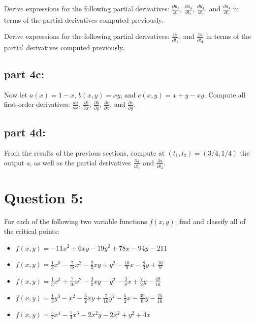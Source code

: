 \documentclass{article}
\newcommand{\partdiff}[2]{\frac{\partial #1}{\partial #2}}
\begin{document}
Derive expressions for the following partial derivatives: \(\partdiff{u_3}{t_1}\), \(\partdiff{u_3}{t_2}\), \(\partdiff{u_4}{t_1}\), and \(\partdiff{u_4}{t_2}\) in terms of the partial derivatives computed previously.

Derive expressions for the following partial derivatives: \(\partdiff{s}{t_1}\), and \(\partdiff{s}{t_2}\) in terms of the partial derivatives computed previously.

\subsection*{part 4c:}

Now let \(a(x) = 1 - x\), \(b(x,y) = xy\), and \(c(x,y) = x + y - xy\). Compute all first-order derivatives: \(\frac{da}{dx}\), \(\frac{\partial b}{\partial x}\), \(\frac{\partial b}{\partial y}\), \(\frac{\partial c}{\partial x}\), and \(\frac{\partial c}{\partial y}\).

\subsection*{part 4d:}

From the results of the previous sections, compute at \((t_1, t_2) = (3/4, 1/4)\) the output \(s\), as well as the partial derivatives \(\frac{\partial s}{\partial t_1}\) and \(\frac{\partial s}{\partial t_2}\).



\section*{Question 5:}

For each of the following two variable functions \(f(x,y)\), find and classify all of the critical points:

\begin{itemize}
\item \(f(x,y) = -11x^2 + 6xy - 19y^2 + 78x - 94y - 211\)
\item \(f(x,y) = \frac{1}{3}x^3 - \frac{7}{18}x^2 - \frac{2}{3}xy + y^2 - \frac{10}{9}x - \frac{8}{3}y + \frac{16}{9}\)
\item \(f(x,y) = \frac{1}{3}x^3 + \frac{7}{16}x^2 - \frac{3}{2}xy - y^2 - \frac{3}{8}x + \frac{7}{2}y - \frac{49}{16}\)
\item \(f(x,y) = \frac{1}{3}y^3 - x^2 - \frac{3}{2}xy + \frac{7}{16}y^2 - \frac{5}{2}x - \frac{39}{8}y - \frac{25}{16}\)
\item \(f(x,y) = \frac{5}{4}x^4 - \frac{1}{3}x^3 - 2x^2y - 2x^2 + y^2 + 4x\)
\end{itemize}
\end{document}
